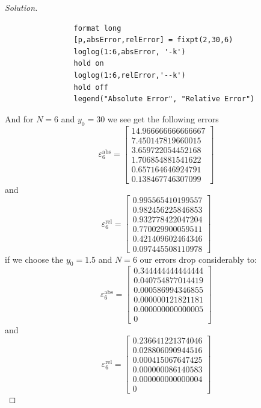 \documentclass[12pt]{amsart}
\newenvironment{solution}
{\begin{proof}[Solution]}
{\end{proof}}
\begin{document}
\begin{onehalfspace}
\begin{solution}
\begin{verbatim}
                format long
                [p,absError,relError] = fixpt(2,30,6)
                loglog(1:6,absError, '-k')
                hold on
                loglog(1:6,relError,'--k')
                hold off
                legend("Absolute Error", "Relative Error")
            \end{verbatim}
            And for $N=6$ and $y_0=30$ we see get the following errors
            \begin{displaymath}
                \varepsilon_6^{\text{abs}} = \left[\begin{matrix}14.966666666666667 \\  7.450147819660015 \\  3.659722054452168 \\  1.706854881541622 \\  0.657164646924791  \\ 0.138467746307099\end{matrix}\right]
            \end{displaymath}
            and
            \begin{displaymath}
                \varepsilon_6^{\text{rel}} = \left[\begin{matrix}0.995565410199557  \\ 0.982456225846853 \\  0.932778422047204 \\  0.770029900059511  \\ 0.421409602464346  \\ 0.097445508110978\end{matrix}\right]
            \end{displaymath}
            if we choose the $y_0 = 1.5$ and $N=6$ our errors drop considerably to:
            \begin{displaymath}
                \varepsilon_6^{\text{abs}} = \left[\begin{matrix}0.344444444444444\\ 0.040754877014419\\ 0.000586994346855\\ 0.000000121821181\\ 0.000000000000005\\ 0\end{matrix}\right]
            \end{displaymath}
            and
            \begin{displaymath}
                \varepsilon_6^{\text{rel}} = \left[\begin{matrix}0.236641221374046\\   0.028806090944516\\   0.000415067647425\\   0.000000086140583\\   0.000000000000004\\ 0\end{matrix}\right]
            \end{displaymath}
        \end{solution}


\end{onehalfspace}
\end{document}
